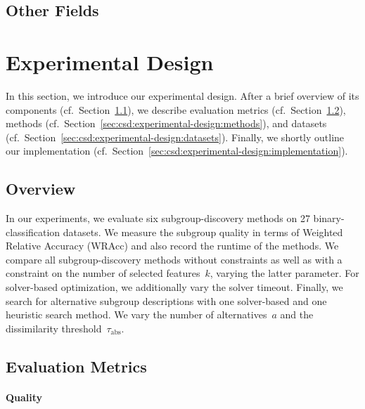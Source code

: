 \documentclass{article}
\theoremstyle{definition}
\begin{document}
\cite{bach2022empirical} \cite{bach2023finding}

\subsection{Other Fields}
\label{sec:csd:related-work:other}

\cite{bailey2014alternative} \cite{grossi2017survey}
\cite{guidotti2022counterfactual}
\cite{narodytska2018learning} \cite{schidler2021sat} \cite{yu2021learning}

\section{Experimental Design}
\label{sec:csd:experimental-design}

In this section, we introduce our experimental design.
After a brief overview of its components (cf.~Section~\ref{sec:csd:experimental-design:overview}), we describe evaluation metrics (cf.~Section~\ref{sec:csd:experimental-design:metrics}), methods (cf.~Section~\ref{sec:csd:experimental-design:methods}), and datasets (cf.~Section~\ref{sec:csd:experimental-design:datasets}).
Finally, we shortly outline our implementation (cf.~Section~\ref{sec:csd:experimental-design:implementation}).

\subsection{Overview}
\label{sec:csd:experimental-design:overview}

In our experiments, we evaluate six subgroup-discovery methods on 27 binary-classification datasets.
We measure the subgroup quality in terms of Weighted Relative Accuracy (WRAcc) and also record the runtime of the methods.
We compare all subgroup-discovery methods without constraints as well as with a constraint on the number of selected features~$k$, varying the latter parameter.
For solver-based optimization, we additionally vary the solver timeout.
Finally, we search for alternative subgroup descriptions with one solver-based and one heuristic search method.
We vary the number of alternatives~$a$ and the dissimilarity threshold~$\tau_{\text{abs}}$.

\subsection{Evaluation Metrics}
\label{sec:csd:experimental-design:metrics}

\paragraph{Quality}
\end{document}
